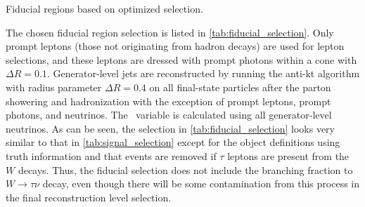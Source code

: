 \begin{table}[ht!]
\centering
\begin{small}

\end{small}
\caption{Fiducial regions based on optimized selection.}
\label{tab:fiducial_selection}
\end{table}

The chosen fiducial region selection 
is listed in \tab\ref{tab:fiducial_selection}.
Only prompt leptons (those not originating from hadron decays) are used for 
lepton selections, and these leptons are dressed with prompt photons 
within a cone with $\Delta R = 0.1$. Generator-level jets are 
reconstructed by running the anti-kt algorithm with radius 
parameter $\Delta R = 0.4$ on all final-state particles 
after the parton showering and hadronization with the exception of prompt 
leptons, prompt photons, and neutrinos. The \MET~variable is calculated 
using all generator-level neutrinos. 
As can be seen, the selection 
in \tab\ref{tab:fiducial_selection} looks very similar to that in 
\tab\ref{tab:signal_selection} except for the object definitions
using truth information and that 
events are removed if $\tau$ leptons are present from the $W$ decays.  
Thus, the fiducial selection
does not include the branching fraction to $W\rightarrow\tau\nu$ decay, 
even though there will be some contamination from this process in the final 
reconstruction level selection. 



